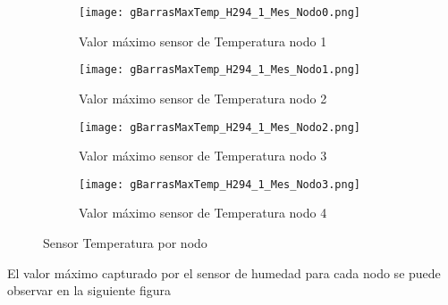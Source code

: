 \documentclass{article}
\begin{document}
        \begin{figure}[h!]
            \centering\begin{subfigure}[h]{0.42\linewidth}
                                    \texttt{[image: gBarrasMaxTemp\_H294\_1\_Mes\_Nodo0.png]}
                                    \caption{Valor máximo sensor de Temperatura nodo 1}
                                    \label{fig:TempMax1}
                                \end{subfigure}
                                \begin{subfigure}[h]{0.42\linewidth}
                                    \texttt{[image: gBarrasMaxTemp\_H294\_1\_Mes\_Nodo1.png]}
                                    \caption{Valor máximo sensor de Temperatura nodo 2}
                                    \label{fig:TempMax2}
                                \end{subfigure}
                                \begin{subfigure}[h]{0.42\linewidth}
                                    \texttt{[image: gBarrasMaxTemp\_H294\_1\_Mes\_Nodo2.png]}
                                    \caption{Valor máximo sensor de Temperatura nodo 3}
                                    \label{fig:TempMax3}
                                \end{subfigure}
                                \begin{subfigure}[h]{0.42\linewidth}
                                    \texttt{[image: gBarrasMaxTemp\_H294\_1\_Mes\_Nodo3.png]}
                                    \caption{Valor máximo sensor de Temperatura nodo 4}
                                    \label{fig:TempMax4}
                                \end{subfigure}
                                \caption{Sensor Temperatura por nodo}
            \label{fig:fig4}
        \end{figure}
        \newline El valor máximo capturado por el sensor de humedad para cada nodo se puede observar en la siguiente figura
\end{document}
